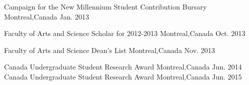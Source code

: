 \documentclass[11pt, a4paper]{awesome-cv} %
\begin{document}


\begin{cvhonors}	%
	
	\cvhonor
	{Campaign for the New Millennium Student Contribution Bursary} %
	{} %
	{Montreal,Canada} %
	{Jan. 2013} %
		
	\cvhonor
	{Faculty of Arts and Science Scholar for 2012-2013} %
	{} %
	{Montreal,Canada} %
	{Oct. 2013} %
		
	
	\cvhonor
	{Faculty of Arts and Science Dean’s List} %
	{} %
	{Montreal,Canada} %
	{Nov. 2013} %
	
	
	\cvhonor
	{Canada Undergraduate Student Research Award} %
	{} %
	{Montreal,Canada} %
	{Jun. 2014} %
	\cvhonor
	{Canada Undergraduate Student Research Award} %
	{} %
	{Montreal,Canada} %
	{Jun. 2015} %
		
		
		

	
\end{cvhonors}
\end{document}
